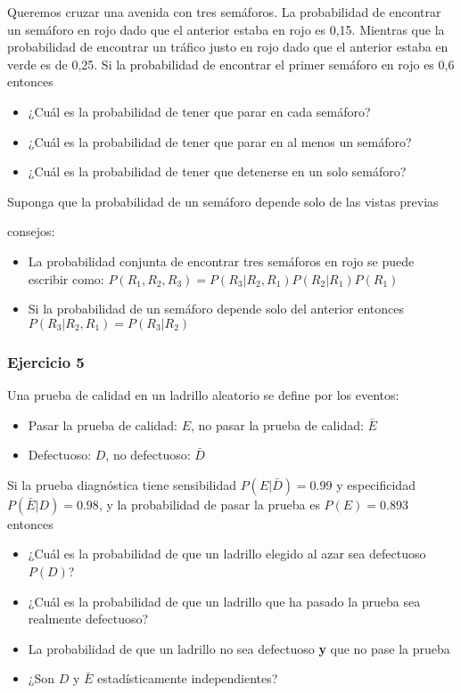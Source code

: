 \documentclass[
]{book}
\providecommand{\tightlist}{%
  \setlength{\itemsep}{0pt}\setlength{\parskip}{0pt}}
\begin{document}
Queremos cruzar una avenida con tres semáforos. La probabilidad de encontrar un semáforo en rojo dado que el anterior estaba en rojo es 0,15. Mientras que la probabilidad de encontrar un tráfico justo en rojo dado que el anterior estaba en verde es de 0,25. Si la probabilidad de encontrar el primer semáforo en rojo es 0,6 entonces

\begin{itemize}
\tightlist
\item
  ¿Cuál es la probabilidad de tener que parar en cada semáforo?
\item
  ¿Cuál es la probabilidad de tener que parar en al menos un semáforo?
\item
  ¿Cuál es la probabilidad de tener que detenerse en un solo semáforo?
\end{itemize}

Suponga que la probabilidad de un semáforo depende solo de las vistas previas

consejos:

\begin{itemize}
\item
  La probabilidad conjunta de encontrar tres semáforos en rojo se puede escribir como:
  \(P(R_1,R_2,R_3)=P(R_3|R_2,R_1)P(R_2|R_1)P(R_1)\)
\item
  Si la probabilidad de un semáforo depende solo del anterior entonces
  \(P(R_3|R_2,R_1)=P(R_3|R_2)\)
\end{itemize}

\hypertarget{ejercicio-5}{%
\subsubsection{Ejercicio 5}\label{ejercicio-5}}

Una prueba de calidad en un ladrillo aleatorio se define por los eventos:

\begin{itemize}
\tightlist
\item
  Pasar la prueba de calidad: \(E\), no pasar la prueba de calidad: \(\bar{E}\)
\item
  Defectuoso: \(D\), no defectuoso: \(\bar{D}\)
\end{itemize}

Si la prueba diagnóstica tiene sensibilidad \(P(E|\bar{D})=0.99\) y especificidad \(P(\bar{E}|D)=0.98\), y la probabilidad de pasar la prueba es \(P(E) =0.893\) entonces

\begin{itemize}
\item
  ¿Cuál es la probabilidad de que un ladrillo elegido al azar sea defectuoso \(P(D)\)?
\item
  ¿Cuál es la probabilidad de que un ladrillo que ha pasado la prueba sea realmente defectuoso?
\item
  La probabilidad de que un ladrillo no sea defectuoso \textbf{y} que no pase la prueba
\item
  ¿Son \(D\) y \(\bar{E}\) estadísticamente independientes?
\end{itemize}
\end{document}
